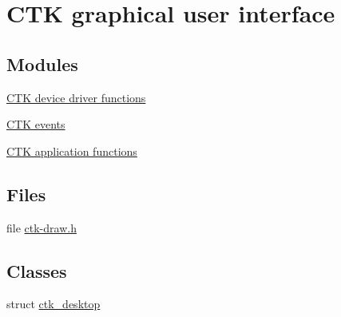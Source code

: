 \hypertarget{group__ctk}{}\section{C\+T\+K graphical user interface}
\label{group__ctk}
\subsection*{Modules}
\begin{DoxyCompactItemize}
\item 
\hyperlink{group__ctkdraw}{C\+T\+K device driver functions}
\item 
\hyperlink{group__ctkevents}{C\+T\+K events}
\item 
\hyperlink{group__ctkappfunc}{C\+T\+K application functions}
\end{DoxyCompactItemize}
\subsection*{Files}
\begin{DoxyCompactItemize}
\item 
file \hyperlink{ctk-draw_8h}{ctk-\/draw.\+h}
\end{DoxyCompactItemize}
\subsection*{Classes}
\begin{DoxyCompactItemize}
\item 
struct \hyperlink{structctk__desktop}{ctk\+\_\+desktop}
\end{DoxyCompactItemize}
